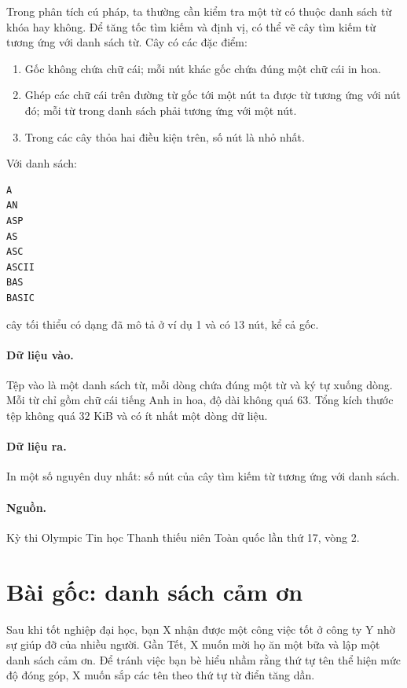 \documentclass[11pt]{article}
\begin{document}
Trong phân tích cú pháp, ta thường cần kiểm tra một từ có thuộc danh sách từ
khóa hay không. Để tăng tốc tìm kiếm và định vị, có thể vẽ cây tìm kiếm từ
tương ứng với danh sách từ. Cây có các đặc điểm:
\begin{enumerate}
  \item Gốc không chứa chữ cái; mỗi nút khác gốc chứa đúng một chữ cái in hoa.
  \item Ghép các chữ cái trên đường từ gốc tới một nút ta được từ tương ứng
  với nút đó; mỗi từ trong danh sách phải tương ứng với một nút.
  \item Trong các cây thỏa hai điều kiện trên, số nút là nhỏ nhất.
\end{enumerate}

Với danh sách:
\begin{verbatim}
A
AN
ASP
AS
ASC
ASCII
BAS
BASIC
\end{verbatim}
cây tối thiểu có dạng đã mô tả ở ví dụ 1 và có \(13\) nút, kể cả gốc.

\paragraph{Dữ liệu vào.}
Tệp vào là một danh sách từ, mỗi dòng chứa đúng một từ và ký tự xuống dòng.
Mỗi từ chỉ gồm chữ cái tiếng Anh in hoa, độ dài không quá \(63\). Tổng kích
thước tệp không quá \(32\) KiB và có ít nhất một dòng dữ liệu.

\paragraph{Dữ liệu ra.}
In một số nguyên duy nhất: số nút của cây tìm kiếm từ tương ứng với danh sách.

\paragraph{Nguồn.}
Kỳ thi Olympic Tin học Thanh thiếu niên Toàn quốc lần thứ 17, vòng 2.

\section{Bài gốc: danh sách cảm ơn}

Sau khi tốt nghiệp đại học, bạn X nhận được một công việc tốt ở công ty Y nhờ
sự giúp đỡ của nhiều người. Gần Tết, X muốn mời họ ăn một bữa và lập một
danh sách cảm ơn. Để tránh việc bạn bè hiểu nhầm rằng thứ tự tên thể hiện
mức độ đóng góp, X muốn sắp các tên theo thứ tự từ điển tăng dần.
\end{document}
